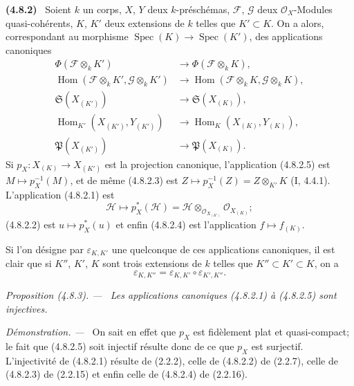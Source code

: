 \documentclass[10pt,oneside]{book}
\newcommand{\oldpage}[2][]{%
  \setcounter{footnote}{0}%
  \marginpar{\scriptsize\textbf{#1}~|~#2}\ignorespaces}
\newenvironment{env}[1][]{\par\medskip\noindent\textbf{(#1)}\ }{\par}
\newenvironment{proposition}[1][]{%
  \par\medskip\noindent\itshape Proposition (#1). ---\ }{\par}
\newenvironment{proof}{%
  \par\medskip\noindent\textit{Démonstration. ---\ }}{\par}
\begin{document}
\begin{env}[4.8.2]
\label{IV.2.4.8.2-fr}
Soient $k$ un corps, $X$, $Y$ deux $k$-préschémas, $\mathscr F$, $\mathscr G$
deux $\mathcal O_X$-Modules quasi-cohérents, $K$, $K'$ deux extensions de $k$
telles que $K'\subset K$. On a alors, correspondant au morphisme
$\operatorname{Spec}(K)\to\operatorname{Spec}(K')$, des applications
canoniques
\begin{align}
\Phi(\mathscr F\otimes_kK')
&\longrightarrow\Phi(\mathscr F\otimes_kK),
\tag{4.8.2.1}
\label{IV.2.4.8.2.1-fr}\\
\operatorname{Hom}(\mathscr F\otimes_kK',\mathscr G\otimes_kK')
&\longrightarrow
\operatorname{Hom}(\mathscr F\otimes_kK,\mathscr G\otimes_kK),
\tag{4.8.2.2}
\label{IV.2.4.8.2.2-fr}\\
\mathfrak S(X_{(K')})&\longrightarrow\mathfrak S(X_{(K)}),
\tag{4.8.2.3}
\label{IV.2.4.8.2.3-fr}\\
\operatorname{Hom}_{K'}(X_{(K')},Y_{(K')})
&\longrightarrow\operatorname{Hom}_K(X_{(K)},Y_{(K)}),
\tag{4.8.2.4}
\label{IV.2.4.8.2.4-fr}\\
\mathfrak P(X_{(K')})&\longrightarrow\mathfrak P(X_{(K)}).
\tag{4.8.2.5}
\label{IV.2.4.8.2.5-fr}
\end{align}
Si $p_X:X_{(K)}\to X_{(K')}$ est la projection canonique, l'application
(4.8.2.5) est $M\mapsto p_X^{-1}(M)$, et de même (4.8.2.3) est
$Z\mapsto p_X^{-1}(Z)=Z\otimes_{K'}K$ (I, 4.4.1). L'application (4.8.2.1)
est
\[
\mathscr H\longmapsto p_X^*(\mathscr H)
=\mathscr H\otimes_{\mathcal O_{X_{(K')}}}\mathcal O_{X_{(K)}};
\]
(4.8.2.2) est $u\mapsto p_X^*(u)$ et enfin (4.8.2.4) est l'application
$f\mapsto f_{(K)}$.

Si l'on désigne par $\varepsilon_{K,K'}$ une quelconque de ces applications
canoniques, il est clair que si $K''$, $K'$, $K$ sont trois extensions de $k$
telles que $K''\subset K'\subset K$, on a
\begin{equation}
\varepsilon_{K,K''}=\varepsilon_{K,K'}\circ\varepsilon_{K',K''}.
\tag{4.8.2.6}
\label{IV.2.4.8.2.6-fr}
\end{equation}
\end{env}

\oldpage[IV-2]{81}

\begin{proposition}[4.8.3]
\label{IV.2.4.8.3-fr}
Les applications canoniques (4.8.2.1) à (4.8.2.5) sont injectives.
\end{proposition}

\begin{proof}
On sait en effet que $p_X$ est fidèlement plat et quasi-compact; le fait que
(4.8.2.5) soit injectif résulte donc de ce que $p_X$ est surjectif.
L'injectivité de (4.8.2.1) résulte de (2.2.2), celle de (4.8.2.2) de (2.2.7),
celle de (4.8.2.3) de (2.2.15) et enfin celle de (4.8.2.4) de (2.2.16).
\end{proof}
\end{document}
